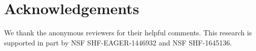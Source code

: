 \documentclass[conference]{IEEEtran}
\begin{document}
\begin{abstract}
%

\end{abstract}




















\balance
\iftrue
\section*{Acknowledgements}
We thank the anonymous reviewers for their helpful comments. %
This research is supported in part by NSF SHF-EAGER-1446932 and  NSF SHF-1645136.
\fi



\end{document}

